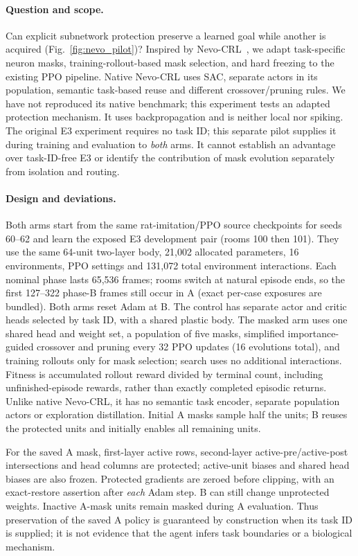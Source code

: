 \documentclass[10pt,onecolumn,letterpaper]{article}
\begin{document}
\paragraph{Question and scope.}
Can explicit subnetwork protection preserve a learned goal while another is acquired (Fig.~\ref{fig:nevo_pilot})?
Inspired by Nevo-CRL~\cite{li2026nevo}, we adapt task-specific neuron masks, training-rollout-based mask selection,
and hard freezing to the existing PPO pipeline. Native Nevo-CRL uses SAC, separate actors in its population,
semantic task-based reuse and different crossover/pruning rules. We have not reproduced its native benchmark;
this experiment tests an adapted protection mechanism. It uses backpropagation and is neither local nor spiking.
The original E3 experiment requires no task ID; this separate pilot supplies it during training and evaluation
to \emph{both} arms. It cannot establish an advantage over task-ID-free E3 or identify the contribution of
mask evolution separately from isolation and routing.

\paragraph{Design and deviations.}
Both arms start from the same rat-imitation/PPO source checkpoints for seeds 60--62 and learn the exposed E3
development pair (rooms 100 then 101). They use the same 64-unit two-layer body, 21,002 allocated parameters,
16 environments, PPO settings and 131,072 total environment interactions. Each nominal phase lasts 65,536 frames;
rooms switch at natural episode ends, so the first 127--322 phase-B frames still occur in A (exact per-case
exposures are bundled). Both arms reset Adam at B. The control has separate actor and critic heads selected
by task ID, with a shared plastic body. The masked arm uses one shared head and weight set, a population of
five masks, simplified importance-guided crossover and pruning every 32 PPO updates (16 evolutions total),
and training rollouts only for mask selection; search uses no additional interactions. Fitness is accumulated
rollout reward divided by terminal count, including unfinished-episode rewards, rather than exactly completed
episodic returns. Unlike native Nevo-CRL,
it has no semantic task encoder, separate population actors or exploration distillation. Initial A masks
sample half the units; B reuses the protected units and initially enables all remaining units.

For the saved A mask, first-layer active rows, second-layer active-pre/active-post intersections and head
columns are protected; active-unit biases and shared head biases are also frozen. Protected gradients are
zeroed before clipping, with an exact-restore assertion after \emph{each} Adam step. B can still change
unprotected weights. Inactive A-mask units remain masked during A evaluation. Thus preservation of the saved
A policy is guaranteed by construction when its task ID is supplied; it is not evidence that the agent infers
task boundaries or a biological mechanism.
\end{document}
